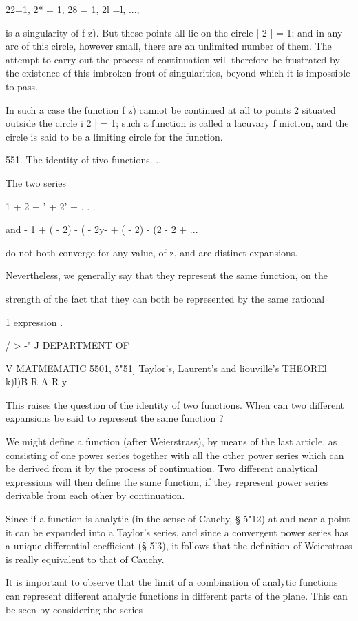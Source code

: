 {{22=1, 2* = 1, 28 = 1, 2l =l, ...,

is a singularity of f z). But these points all lie on the circle | 2 |
= 1; and in any arc of this circle, however small, there are an
unlimited number of them. The attempt to carry out the process of
continuation will therefore be frustrated by the existence of this
imbroken front of singularities, beyond which it is impossible to
pass.

In such a case the function f z) cannot be continued at all to points
2 situated outside the circle i 2 | = 1; such a function is called a
lacuvary f miction, and the circle is said to be a limiting circle for
the function.

551. The identity of tivo functions. .,

The two series

1 + 2 + ' + 2' + . . .

and - 1 + ( - 2) - ( - 2y- + ( - 2) - (2 - 2 + ...

do not both converge for any value, of z, and are distinct expansions.

Nevertheless, we generally say that they represent the same function,
on the

strength of the fact that they can both be represented by the same
rational

1 expression .

/ > -" J DEPARTMENT OF

V MATMEMATIC 5501, 5"51] Taylor's, Laurent's and liouville's THEOREl|
k)l)B R A R y

This raises the question of the identity of two functions. When can
two different expansions be said to represent the same function ?

We might define a function (after Weierstrass), by means of the last
article, as consisting of one power series together with all the other
power series which can be derived from it by the process of
continuation. Two different analytical expressions will then define
the same function, if they represent power series derivable from each
other by continuation.

Since if a function is analytic (in the sense of Cauchy, § 5"12) at
and near a point it can be expanded into a Taylor's series, and since
a convergent power series has a unique differential coefficient (§
5'3), it follows that the definition of Weierstrass is really
equivalent to that of Cauchy.

It is important to observe that the limit of a combination of analytic
functions can represent different analytic functions in different
parts of the plane. This can be seen by considering the series

}}

